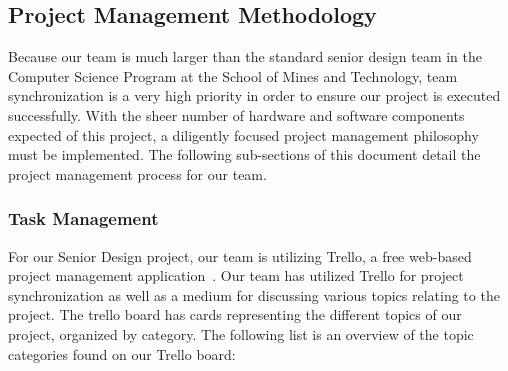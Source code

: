 \subsection{Project  Management Methodology}
Because our team is much larger than the standard senior design team in the Computer Science Program at the School of Mines and Technology, team synchronization is a very high priority in order to ensure our project is executed successfully. With the sheer number of hardware and software components expected of this project, a diligently focused project management philosophy must be implemented. The following sub-sections of this document detail the project management process for our team.
 
\subsubsection{Task Management}
For our Senior Design project, our team is utilizing Trello, a free web-based project management application~\cite{Trello}. Our team has utilized Trello for project synchronization as well as a medium for discussing various topics relating to the project. The trello board has cards representing the different topics of our project, organized by category. The following list is an overview of the topic categories found on our Trello board:

